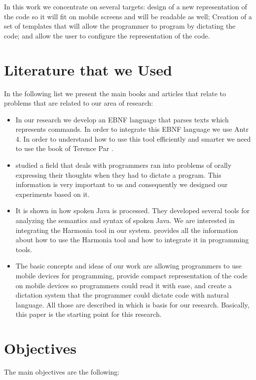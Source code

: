 In this work we concentrate on several targets: design of a new representation of the code so it will fit on mobile screens and will be readable as well; Creation of a set of templates that will allow the programmer to program by dictating the code; and allow the user to configure the representation of the code.

\section{Literature that we Used}
In the following list we present the main books and articles that relate to problems that are related to our area of research:

\begin{itemize}
	\item In our research we develop an EBNF language that parses texts which represents commands. In order to integrate this EBNF language we use Antr 4. In order to understand how to use this tool efficiently and smarter we need to use the book of Terence Par \cite{Terence2012}.
	\item \citet[Chap. 2]{andrew11} studied a field that deals with programmers ran into problems of orally expressing their thoughts when they had to dictate a program. This information is very important to us and consequently we designed our experiments based on it.
	\item It is shown in \citet[Chap. 3]{andrew11} how spoken Java is processed. They developed several tools for analyzing the semantics and syntax of spoken Java. We are interested in integrating the Harmonia tool \cite{harmonia} in our system. \cite{harmonia} provides all the information about how to use the Harmonia tool and how to integrate it in programming tools.
	\item The basic concepts and ideas of our work are allowing programmers to use mobile devices for programming, provide compact representation of the code on mobile devices so programmers could read it with ease, and create a dictation system that the programmer could dictate code with natural language. All those are described in \citet[Programming By Voice and Touch]{yishai13} which is basis for our research. Basically, this paper is the starting point for this research.
\end{itemize}

\section{Objectives}
The main objectives are the following:

